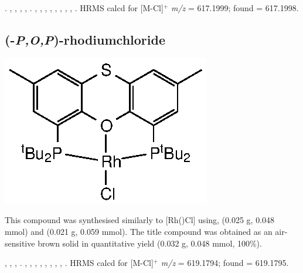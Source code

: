 .
,
,
,
,
.
,
,
,
,
,
,
,
,
.
HRMS calcd for  [M-Cl]$^+$ \emph{m/z} = 617.1999; found = 617.1998.



\subsection*{(\tBuThixantphosk-\emph{P,O,P})-rhodiumchloride}

\begin{structure}[h]
\begin{center}
\includegraphics{../Structures/RhCl(StBu).eps}
\end{center}
\end{structure}

This compound was synthesised similarly to [Rh(\tBusixantphos)Cl] using, \tButhixantphos{} (0.025 g, 0.048 mmol) and  (0.021 g, 0.059 mmol).  The title compound was obtained as an air-sensitive brown solid in quantitative yield (0.032 g, 0.048 mmol, 100\%).  

,
,
,
.
,
,
,
,
,
,
,
,
.
HRMS calcd for  [M-Cl]$^+$ \emph{m/z} = 619.1794; found = 619.1795.



